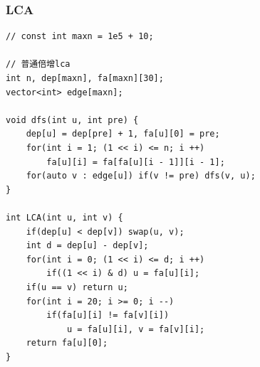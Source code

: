 \documentclass[twoside]{article}
\begin{document}
\subsubsection{LCA}
\begin{lstlisting}
// const int maxn = 1e5 + 10;

// 普通倍增lca
int n, dep[maxn], fa[maxn][30];
vector<int> edge[maxn];

void dfs(int u, int pre) {
	dep[u] = dep[pre] + 1, fa[u][0] = pre;
	for(int i = 1; (1 << i) <= n; i ++) 
		fa[u][i] = fa[fa[u][i - 1]][i - 1];
	for(auto v : edge[u]) if(v != pre) dfs(v, u);
}

int LCA(int u, int v) {
	if(dep[u] < dep[v]) swap(u, v);
	int d = dep[u] - dep[v];
	for(int i = 0; (1 << i) <= d; i ++) 
		if((1 << i) & d) u = fa[u][i];
	if(u == v) return u;
	for(int i = 20; i >= 0; i --) 
		if(fa[u][i] != fa[v][i]) 
			u = fa[u][i], v = fa[v][i];
	return fa[u][0];
}\end{lstlisting}
\end{document}
